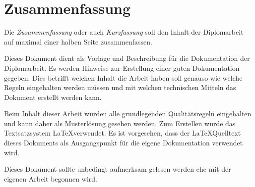 

\chapter*{Zusammenfassung}



Die \emph{Zusammenfassung} oder auch \emph{Kurzfassung} soll den Inhalt der Diplomarbeit auf maximal einer halben Seite zusammenfassen.

Dieses Dokument dient als Vorlage und Beschreibung für die Dokumentation der Diplomarbeit.
Es werden Hinweise zur Erstellung einer guten Dokumentation gegeben.
Dies betrifft welchen Inhalt die Arbeit haben soll genauso wie welche Regeln eingehalten werden müssen und mit welchen technischen Mitteln das Dokument erstellt werden kann.

Beim Inhalt dieser Arbeit wurden alle grundlegenden Qualitätsregeln eingehalten und kann daher als Musterlösung gesehen werden.
Zum Erstellen wurde das Textsatzsystem \LaTeX verwendet.
Es ist vorgesehen, dass der \LaTeX Quelltext dieses Dokuments als Ausgangspunkt für die eigene Dokumentation verwendet wird.

\begin{framed}
Dieses Dokument sollte unbedingt aufmerksam gelesen werden ehe mit der eigenen Arbeit begonnen wird.
\end{framed}

